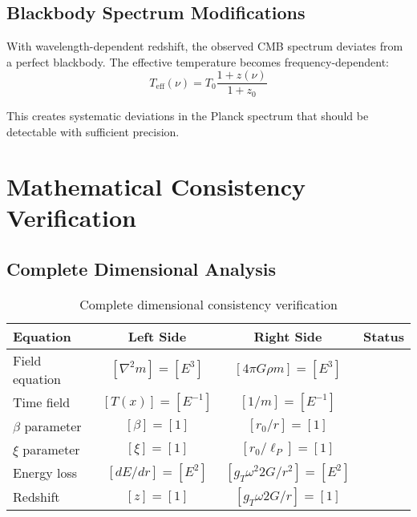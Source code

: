 \documentclass[12pt,a4paper]{article}
\newcommand{\Tfield}{T(x)}
\begin{document}
	\subsection{Blackbody Spectrum Modifications}
	\label{subsec:blackbody_modifications}
	
	With wavelength-dependent redshift, the observed CMB spectrum deviates from a perfect blackbody. The effective temperature becomes frequency-dependent:
	\begin{equation}
		T_{\text{eff}}(\nu) = T_0 \frac{1+z(\nu)}{1+z_0}
	\end{equation}
	
	This creates systematic deviations in the Planck spectrum that should be detectable with sufficient precision.
	
	\section{Mathematical Consistency Verification}
	\label{sec:consistency_verification}
	
	\subsection{Complete Dimensional Analysis}
	\label{subsec:dimensional_analysis}
	
	\begin{table}[htbp]
		\centering
		\begin{tabular}{|l|c|c|c|}
			\hline
			\textbf{Equation} & \textbf{Left Side} & \textbf{Right Side} & \textbf{Status} \\
			\hline
			Field equation & $[\nabla^2 m] = [E^3]$ & $[4\pi G \rho m] = [E^3]$ & \checkmark \\
			Time field & $[\Tfield] = [E^{-1}]$ & $[1/m] = [E^{-1}]$ & \checkmark \\
			$\beta$ parameter & $[\beta] = [1]$ & $[r_0/r] = [1]$ & \checkmark \\
			$\xi$ parameter & $[\xi] = [1]$ & $[r_0/\ell_P] = [1]$ & \checkmark \\
			Energy loss & $[dE/dr] = [E^2]$ & $[g_T \omega^2 2G/r^2] = [E^2]$ & \checkmark \\
			Redshift & $[z] = [1]$ & $[g_T \omega 2G/r] = [1]$ & \checkmark \\
			\hline
		\end{tabular}
		\caption{Complete dimensional consistency verification}
		\label{tab:dim_analysis}
	\end{table}
	
\end{document}
